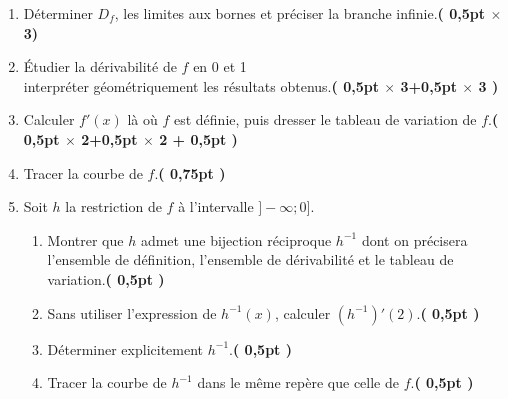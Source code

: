 \documentclass[12pt,a4paper]{article}
\begin{document}
\begin{enumerate}
    \item Déterminer $D_f$, les limites aux bornes et préciser la branche infinie.\hfill \textbf{( 0,5pt $\times$ 3)}
    \item Étudier la dérivabilité de $f$ en 0 et 1\\interpréter géométriquement les résultats obtenus.\hfill \textbf{( 0,5pt $\times$ 3+0,5pt $\times$ 3 )}
    \item Calculer $f'(x)$ là où $f$ est définie, puis dresser le tableau de variation de $f$.\hfill \textbf{( 0,5pt $\times$ 2+0,5pt $\times$ 2 + 0,5pt )}
    \item Tracer la courbe de $f$.\hfill \textbf{( 0,75pt )}
    \item Soit $h$ la restriction de $f$ à l’intervalle $]-\infty ; 0]$.
    \begin{enumerate}
        \item Montrer que $h$ admet une bijection réciproque $h^{-1}$ dont on précisera l’ensemble de définition, l’ensemble de dérivabilité et le tableau de variation.\hfill \textbf{( 0,5pt )}
        \item Sans utiliser l’expression de $h^{-1}(x)$, calculer $(h^{-1})'(2)$.\hfill \textbf{( 0,5pt )}
        \item Déterminer explicitement $h^{-1}$.\hfill \textbf{( 0,5pt )}
        \item Tracer la courbe de $h^{-1}$ dans le même repère que celle de $f$.\hfill \textbf{( 0,5pt )}
    \end{enumerate}
\end{enumerate}
\end{document}
